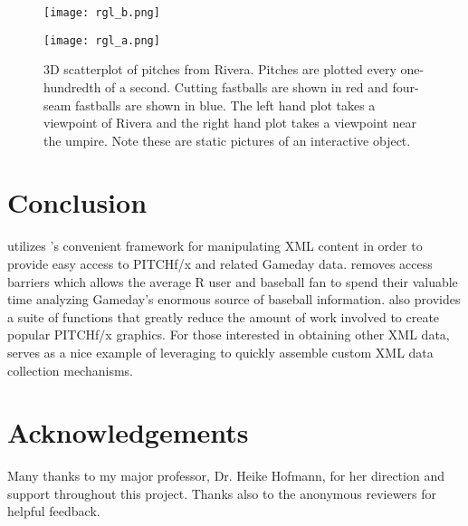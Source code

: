 \begin{article}
\begin{figure}[h]
\begin{minipage}[t]{0.45\textwidth}%
\centerline{\texttt{[image: rgl\_b.png]}}%
\end{minipage}\hspace*{\fill}%
\begin{minipage}[t]{0.45\textwidth}%
\centerline{\texttt{[image: rgl\_a.png]}}%
\end{minipage}

\caption{3D scatterplot of pitches from Rivera. Pitches are plotted every one-hundredth
of a second. Cutting fastballs are shown in red and four-seam fastballs
are shown in blue. The left hand plot takes a viewpoint of Rivera
and the right hand plot takes a viewpoint near the umpire. Note these
are static pictures of an interactive object. \label{fig:rgl}}
\end{figure}

\section{Conclusion}

 utilizes 's convenient framework for manipulating
XML content in order to provide easy access to PITCHf/x and related
Gameday data.  removes access barriers which allows
the average R user and baseball fan to spend their valuable
time analyzing Gameday's enormous source of baseball information.
 also provides a suite of functions that greatly reduce
the amount of work involved to create popular PITCHf/x graphics. For
those interested in obtaining other XML data,  serves
as a nice example of leveraging  to quickly assemble custom
XML data collection mechanisms.

\section{Acknowledgements}

Many thanks to my major professor, Dr. Heike Hofmann, for her direction
and support throughout this project. Thanks also to the anonymous
reviewers for helpful feedback.



\address{Carson Sievert\\
Department of Statistics\\
Iowa State University}\\

\end{article}



